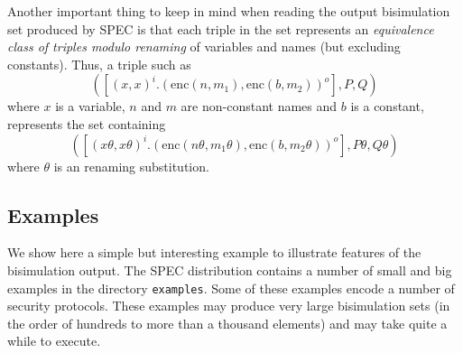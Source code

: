\documentclass{article}
\begin{document}
Another important thing to keep in mind when reading the output bisimulation set
produced by SPEC is that each triple in the set represents an
{\em equivalence class of triples modulo renaming} of variables and names (but
excluding constants). 
Thus, a triple such as 
$$
([(x,x)^i.(\mathrm{enc}(n,m_1), \mathrm{enc}(b,m_2))^o], P, Q)
$$
where $x$ is a variable, $n$ and $m$ are non-constant names and
$b$ is a constant, represents the set containing 
$$
([(x\theta,x\theta)^i.(\mathrm{enc}(n\theta,m_1\theta), \mathrm{enc}(b,m_2\theta))^o], P\theta, Q\theta)
$$
where $\theta$ is an renaming substitution.

\subsection{Examples}


We show here a simple but interesting example to illustrate features of the bisimulation output. 
The SPEC distribution contains a number of small and big examples in the directory \texttt{examples}.
Some of these examples encode a number of security protocols. These examples may produce
very large bisimulation sets (in the order of hundreds to more than a thousand elements) 
and may take quite a while to execute.
\end{document}
